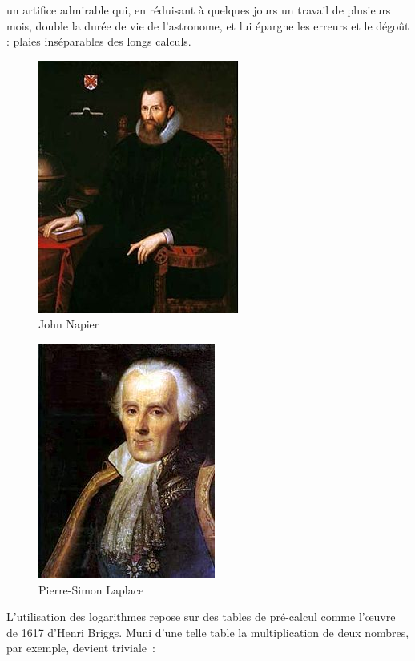 \begin{coolquote} un artifice admirable qui, en réduisant à quelques jours un travail de plusieurs mois, double la durée de vie de l'astronome, et lui épargne les erreurs et le dégoût : plaies inséparables des longs calculs.
\end{coolquote}

\begin{minipage}[H]{0.49\linewidth}
  \begin{figure}[H]
  \centering
  \includegraphics[height=0.15\paperheight]{../resources/illustrations/napier}
  \caption{John Napier}
  \end{figure}
\end{minipage}
\begin{minipage}[H]{0.49\linewidth}
  \begin{figure}[H]
  \centering
  \includegraphics[height=0.15\paperheight]{../resources/illustrations/laplace}
  \caption{Pierre-Simon Laplace}
  \end{figure}
\end{minipage}
L'utilisation des logarithmes repose sur des tables de pré-calcul comme l'\oe{}uvre de 1617 d'Henri Briggs. Muni d'une telle table la multiplication de deux nombres, par exemple, devient triviale~:

